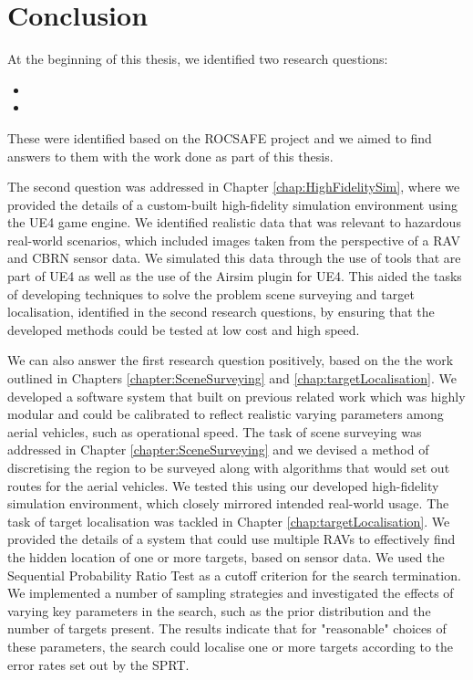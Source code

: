 
\chapter{Conclusion}
At the beginning of this thesis, we identified two research questions: 
\begin{itemize}
    \item  
    \item 
\end{itemize}
These were identified based on the ROCSAFE project and we aimed to find answers to them with the work done as part of this thesis.

\par The second question was addressed in Chapter \ref{chap:HighFidelitySim}, where we provided the details of a custom-built high-fidelity simulation environment using the UE4 game engine. We identified realistic data that was relevant to hazardous real-world scenarios, which included images taken from the perspective of a RAV and CBRN sensor data. We simulated this data through the use of tools that are part of UE4 as well as the use of the Airsim \cite{Shah2017AirSim:Vehicles} plugin for UE4. This aided the tasks of developing techniques to solve the problem scene surveying and target localisation, identified in the second research questions, by ensuring that the developed methods could be tested at low cost and high speed.

\par We can also answer the first research question positively, based on the the work outlined in Chapters \ref{chapter:SceneSurveying} and \ref{chap:targetLocalisation}. We developed a software system that built on previous related work which was highly modular and could be calibrated to reflect realistic varying parameters among aerial vehicles, such as operational speed. The task of scene surveying was addressed in Chapter \ref{chapter:SceneSurveying} and we devised a method of discretising the region to be surveyed along with algorithms that would set out routes for the aerial vehicles. We tested this using our developed high-fidelity simulation environment, which closely mirrored intended real-world usage. The task of target localisation was tackled in Chapter \ref{chap:targetLocalisation}. We provided the details of a system that could use multiple RAVs to effectively find the hidden location of one or more targets, based on sensor data. We used the Sequential Probability Ratio Test as a cutoff criterion for the search termination. We implemented a number of sampling strategies and investigated the effects of varying key parameters in the search, such as the prior distribution and the number of targets present. The results indicate that for "reasonable" choices of these parameters, the search could localise one or more targets according to the error rates set out by the SPRT.